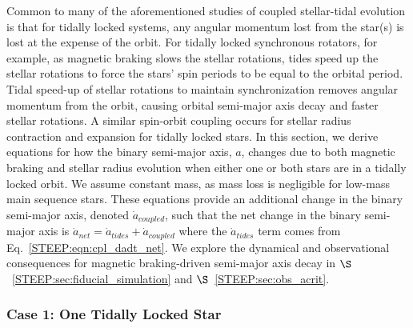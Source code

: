 Common to many of the aforementioned studies of coupled stellar-tidal evolution is that for tidally locked systems, any angular momentum lost from the star(s) is lost at the expense of the orbit.  For tidally locked synchronous rotators, for example, as magnetic braking slows the stellar rotations, tides speed up the stellar rotations to force the stars' spin periods to be equal to the orbital period.  Tidal speed-up of stellar rotations to maintain synchronization removes angular momentum from the orbit, causing orbital semi-major axis decay and faster stellar rotations.  A similar spin-orbit coupling occurs for stellar radius contraction and expansion for tidally locked stars.  In this section, we derive equations for how the binary semi-major axis, $a$, changes due to both magnetic braking and stellar radius evolution when either one or both stars are in a tidally locked orbit.  We assume constant mass, as mass loss is negligible for low-mass main sequence stars.  These equations provide an additional change in the binary semi-major axis, denoted $\dot{a}_{coupled}$, such that the net change in the binary semi-major axis is $\dot{a}_{net} = \dot{a}_{tides} + \dot{a}_{coupled}$ where the $\dot{a}_{tides}$ term comes from \eqtide Eq.~{\ref{STEEP:eqn:cpl_dadt_net}}. We explore the dynamical and observational consequences for magnetic braking-driven semi-major axis decay in $\S$~\ref{STEEP:sec:fiducial_simulation} and $\S$~\ref{STEEP:sec:obs_acrit}.

\subsubsection{Case 1: One Tidally Locked Star}

